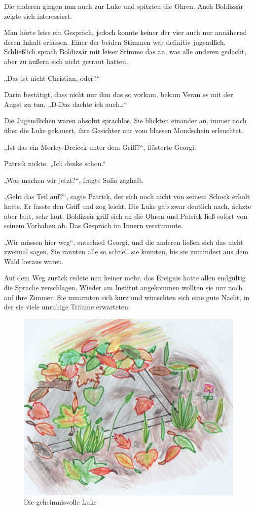 \documentclass[oneside]{memoir}
\begin{document}
Die anderen gingen nun auch zur Luke und spitzten die Ohren. Auch Boldizsár zeigte sich interessiert.

Man hörte leise ein Gespräch, jedoch konnte keiner der vier auch nur annähernd deren Inhalt erfassen. Einer der beiden Stimmen war definitiv jugendlich. Schließlich sprach Boldizsár mit leiser Stimme das an, was alle anderen gedacht, aber zu äußern sich nicht getraut hatten.

„Das ist nicht Christian, oder?“

Darin bestätigt, dass nicht nur ihm das so vorkam, bekam Veran es mit der Angst zu tun. „D-Das dachte ich auch\ldots“

Die Jugendlichen waren absolut sprachlos. Sie blickten einander an, immer noch über die Luke gekauert, ihre Gesichter nur vom blassen Mondschein erleuchtet.

„Ist das ein Morley-Dreieck unter dem Griff?“, flüsterte Georgi.

Patrick nickte. „Ich denke schon.“

„Was machen wir jetzt?“, fragte Sofia zaghaft.

„Geht das Teil auf?“, sagte Patrick, der sich noch nicht von seinem Schock erholt hatte. Er fasste den Griff und zog leicht. Die Luke gab zwar deutlich nach, ächzte aber laut, sehr laut. Boldizsár griff sich an die Ohren und Patrick ließ sofort von seinem Vorhaben ab. Das Gespräch im Innern verstummte.

„Wir müssen hier weg“, entschied Georgi, und die anderen ließen sich das nicht zweimal sagen. Sie rannten alle so schnell sie konnten, bis sie zumindest aus dem Wald heraus waren.

Auf dem Weg zurück redete nun keiner mehr, das Ereignis hatte allen endgültig die Sprache verschlagen. Wieder am Institut angekommen wollten sie nur noch auf ihre Zimmer. Sie umarmten sich kurz und wünschten sich eine gute Nacht, in der sie viele unruhige Träume erwarteten.

\bigskip
\begin{figure}[htbp] 
  \centering
     \includegraphics[scale=0.63]{Bilder/luke1.png}
  \caption{Die geheimnisvolle Luke}
\end{figure}
\end{document}
